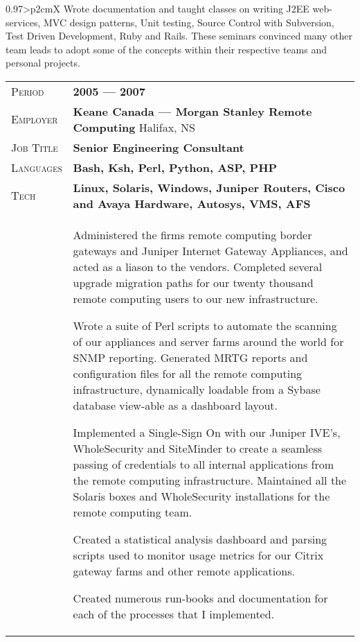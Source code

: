 \documentclass[a4paper, oneside, final]{scrartcl}
\newcommand{\gray}{\rowcolor[gray]{.90}}
\begin{document}
\begin{center}
\begin{tabularx}{0.97\linewidth}{>{\raggedleft\scshape}p{2cm}X}
Wrote documentation and taught classes on writing J2EE web-services, MVC design patterns, Unit testing, Source Control with Subversion, Test Driven Development, Ruby and Rails. These seminars convinced many other team leads to adopt some of the concepts within their respective teams and personal projects.
\end{tabularx}

\vspace{12pt}


\begin{tabularx}{0.97\linewidth}{>{\raggedleft\scshape}p{2cm}X}
\gray Period & \textbf{2005 --- 2007}\\
\gray Employer & \textbf{Keane Canada --- Morgan Stanley Remote Computing} \hfill Halifax, NS\\
\gray Job Title & \textbf{Senior Engineering Consultant}\\
\gray Languages & \textbf{Bash, Ksh, Perl, Python, ASP, PHP}\\
\gray Tech & \textbf{Linux, Solaris, Windows, Juniper Routers, Cisco and Avaya Hardware, Autosys, VMS, AFS}\\
& Administered the firms remote computing border gateways and Juniper Internet Gateway Appliances, and acted as a liason to the vendors. Completed several upgrade migration paths for our twenty thousand remote computing users to our new infrastructure.

Wrote a suite of Perl scripts to automate the scanning of our appliances and server farms around the world for SNMP reporting. Generated MRTG reports and configuration files for all the remote computing infrastructure, dynamically loadable from a Sybase database view-able as a dashboard layout.

Implemented a Single-Sign On with our Juniper IVE's, WholeSecurity and SiteMinder to create a seamless passing of credentials to all internal applications from the remote computing infrastructure. Maintained all the Solaris boxes and WholeSecurity installations for the remote computing team.

Created a statistical analysis dashboard and parsing scripts used to monitor usage metrics for our Citrix gateway farms and other remote applications.

Created numerous run-books and documentation for each of the processes that I implemented.
\end{tabularx}

\vspace{12pt}


\end{center}
\end{document}

